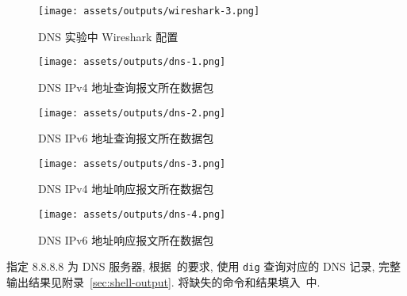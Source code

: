 \documentclass{ned-article}
\begin{document}
\begin{figure}[H]
    \centering
    \texttt{[image: assets/outputs/wireshark-3.png]}
    \caption{DNS 实验中 Wireshark 配置}\label{fig:wireshark-3}
\end{figure}

\begin{figure}[H]
    \centering
    \texttt{[image: assets/outputs/dns-1.png]}
    \caption{DNS IPv4 地址查询报文所在数据包}\label{fig:dns-1}
\end{figure}

\begin{figure}[H]
    \centering
    \texttt{[image: assets/outputs/dns-2.png]}
    \caption{DNS IPv6 地址查询报文所在数据包}\label{fig:dns-2}
\end{figure}

\begin{figure}[H]
    \centering
    \texttt{[image: assets/outputs/dns-3.png]}
    \caption{DNS IPv4 地址响应报文所在数据包}\label{fig:dns-3}
\end{figure}

\begin{figure}[H]
    \centering
    \texttt{[image: assets/outputs/dns-4.png]}
    \caption{DNS IPv6 地址响应报文所在数据包}\label{fig:dns-4}
\end{figure}

指定 8.8.8.8 为 DNS 服务器, 根据~的要求, 使用 \texttt{dig} 查询对应的 DNS 记录, 完整输出结果见附录~\ref{sec:shell-output}. 将缺失的命令和结果填入~中.
\end{document}
